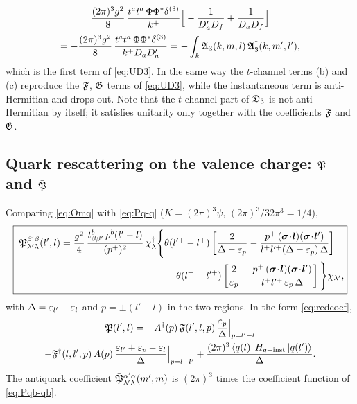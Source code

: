 \begin{multline}
\frac{(2\pi)^{3}g^{2}}{8}\,\frac{t^{a}t^{a}\,\Phi\Phi^{*}\delta^{(3)}}{k^{+}}\Big[-\frac{1}{D_{a}'D_{f}}+\frac{1}{D_{a}D_{f}}\Big]
\\=-\frac{(2\pi)^{3}g^{2}}{8}\,\frac{t^{a}t^{a}\,\Phi\Phi^{*}\delta^{(3)}}{k^{+}D_{a}D_{a}'}
=-\int_{k}\mathfrak{A}_{3}(k,m,l)\,\mathfrak{A}_{3}^{\dagger}(k,m',l'),
\end{multline}
which is the first term of \eqref{eq:UD3}. In the same way the $t$-channel terms (b) and (c)
reproduce the $\mathfrak{F}$, $\mathfrak{G}$ terms of \eqref{eq:UD3}, while the instantaneous term is anti-Hermitian
and drops out. Note that the $t$-channel part of $\mathfrak{D}_{3}$ is not anti-Hermitian by itself; it
satisfies unitarity only together with the coefficients $\mathfrak{F}$ and $\mathfrak{G}$.

\subsection{Quark rescattering on the valence charge: $\mathfrak{P}$ and $\bar{\mathfrak{P}}$}

Comparing \eqref{eq:Omq} with \eqref{eq:Pq-q} ($K=(2\pi)^{3}\psi$, $(2\pi)^{3}/32\pi^{3}=1/4$),
\begin{equation}
\boxed{\;
\begin{aligned}
\mf P^{\beta'\beta}_{\lambda'\lambda}(l',l)=\frac{g^{2}}{4}\,\frac{t^{b}_{\beta\beta'}\,\rho^{b}(l'-l)}{(p^{+})^{2}}\,
\chi^{\dg}_{\lambda}\Bigg\{&\theta(l'^{+}-l^{+})\left[\frac{2}{\Delta-\eps_{p}}
-\frac{p^{+}\,(\bm\sigma\!\cdot\!\bm l)(\bm\sigma\!\cdot\!\bm l')}{l^{+}l'^{+}(\Delta-\eps_{p})\,\Delta}\right]
\\
&-\theta(l^{+}-l'^{+})\left[\frac{2}{\eps_{p}}
-\frac{p^{+}\,(\bm\sigma\!\cdot\!\bm l)(\bm\sigma\!\cdot\!\bm l')}{l^{+}l'^{+}\,\eps_{p}\,\Delta}\right]\Bigg\}\chi_{\lambda'},
\end{aligned}}
\label{eq:P}
\end{equation}
with $\Delta=\varepsilon_{l'}-\varepsilon_{l}$ and $p=\pm(l'-l)$ in the two regions. In the form \eqref{eq:redcoef},
\begin{multline}
\mathfrak{P}(l',l)=-A^{\dagger}(p)\,\mathfrak{F}(l',l,p)\,\frac{\varepsilon_{p}}{\Delta}\Big|_{p=l'-l}
\\-\mathfrak{F}^{\dagger}(l,l',p)\,A(p)\,\frac{\varepsilon_{l'}+\varepsilon_{p}-\varepsilon_{l}}{\Delta}\Big|_{p=l-l'}
+\frac{(2\pi)^{3}\left\langle q(l)\right|H_{q-{\rm inst}}\left|q(l')\right\rangle}{\Delta} .
\label{eq:Pred}
\end{multline}
The antiquark coefficient $\bar{\mathfrak{P}}^{\alpha'\alpha}_{\lambda'\lambda}(m',m)$ is $(2\pi)^{3}$ times the
coefficient function of \eqref{eq:Pqb-qb}.

